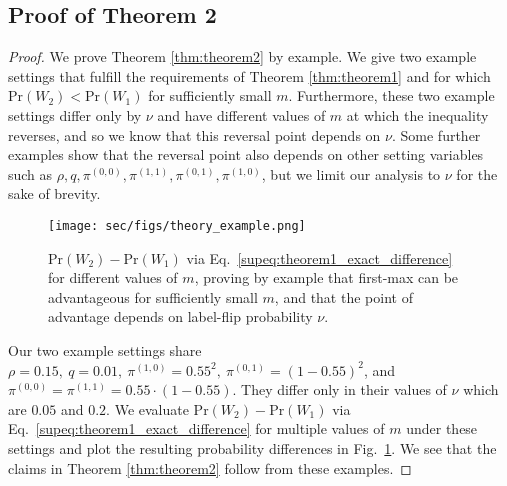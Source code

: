 \subsection{Proof of Theorem 2}
\label{sec:theorem2_proof}
\begin{proof}
We prove Theorem \ref{thm:theorem2} by example. We give two example settings that fulfill the requirements of Theorem \ref{thm:theorem1} and for which $\textrm{Pr}(W_2) < \textrm{Pr}(W_1)$ for sufficiently small $m$. Furthermore, these two example settings differ only by $\nu$ and have different values of $m$ at which the inequality reverses, and so we know that this reversal point depends on $\nu$. Some further examples show that the reversal point also depends on other setting variables such as $\rho, q, \pi^{(0,0)}, \pi^{(1,1)},\pi^{(0,1)}, \pi^{(1,0)}$, but we limit our analysis to $\nu$ for the sake of brevity.

\begin{figure}[t]
  \centering
    \texttt{[image: sec/figs/theory\_example.png]}
    \caption{$\textrm{Pr}(W_2) - \textrm{Pr}(W_1)$ via Eq.~\eqref{supeq:theorem1_exact_difference} for different values of $m$, proving by example that first-max can be advantageous for sufficiently small $m$, and that the point of advantage depends on label-flip probability $\nu$.}
    \label{fig:theorem2_example}
\end{figure}

Our two example settings share $\rho = 0.15,\ q = 0.01,\ \pi^{(1,0)} = 0.55^2,\ \pi^{(0,1)} = (1 - 0.55)^2$, and $\pi^{(0,0)} = \pi^{(1,1)} = 0.55 \cdot (1 - 0.55)$. They differ only in their values of $\nu$ which are $0.05$ and $0.2$. We evaluate $\textrm{Pr}(W_2) - \textrm{Pr}(W_1)$ via Eq.~\eqref{supeq:theorem1_exact_difference} for multiple values of $m$ under these settings and plot the resulting probability differences in Fig.~\ref{fig:theorem2_example}. We see that the claims in Theorem \ref{thm:theorem2} follow from these examples.
\end{proof}
